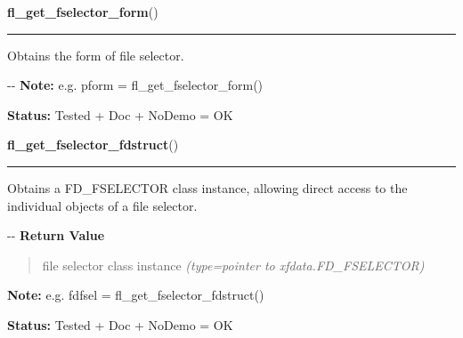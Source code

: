     \label{xformslib:flgoodies:fl_get_fselector_form}

    \vspace{0.5ex}

\hspace{.8\funcindent}\begin{boxedminipage}{\funcwidth}

    \raggedright \textbf{fl\_get\_fselector\_form}()

    \vspace{-1.5ex}

    \rule{\textwidth}{0.5\fboxrule}
\setlength{\parskip}{2ex}

Obtains the form of file selector.

-{}-
\setlength{\parskip}{1ex}
\textbf{Note:} 
e.g. pform = fl\_get\_fselector\_form()


\textbf{Status:} 
Tested + Doc + NoDemo = OK


    \end{boxedminipage}

    \label{xformslib:flgoodies:fl_get_fselector_fdstruct}

    \vspace{0.5ex}

\hspace{.8\funcindent}\begin{boxedminipage}{\funcwidth}

    \raggedright \textbf{fl\_get\_fselector\_fdstruct}()

    \vspace{-1.5ex}

    \rule{\textwidth}{0.5\fboxrule}
\setlength{\parskip}{2ex}

Obtains a FD\_FSELECTOR class instance, allowing direct access to the
individual objects of a file selector.

-{}-
\setlength{\parskip}{1ex}
      \textbf{Return Value}
    \vspace{-1ex}

      \begin{quote}

file selector class instance
      {\it (type=pointer to xfdata.FD\_FSELECTOR)}

      \end{quote}

\textbf{Note:} 
e.g. fdfsel = fl\_get\_fselector\_fdstruct()


\textbf{Status:} 
Tested + Doc + NoDemo = OK


    \end{boxedminipage}

